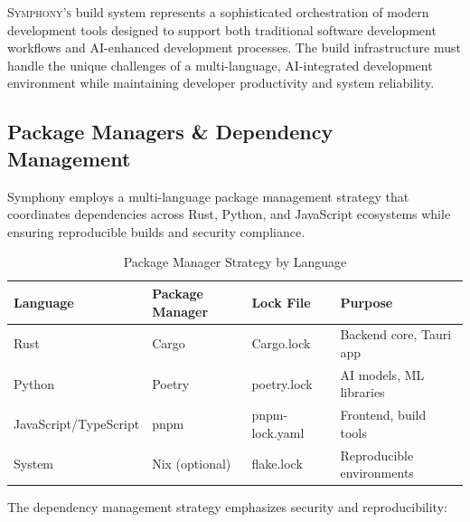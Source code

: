 
\lettrine{S}{ymphony's} build system represents a sophisticated orchestration of modern development tools designed to support both traditional software development workflows and AI-enhanced development processes. The build infrastructure must handle the unique challenges of a multi-language, AI-integrated development environment while maintaining developer productivity and system reliability.

\subsection*{Package Managers \& Dependency Management}

Symphony employs a multi-language package management strategy that coordinates dependencies across Rust, Python, and JavaScript ecosystems while ensuring reproducible builds and security compliance.

\begin{table}[h]
\centering
\caption{Package Manager Strategy by Language}
\begin{tabular}{@{}llll@{}}
\toprule
\textbf{Language} & \textbf{Package Manager} & \textbf{Lock File} & \textbf{Purpose} \\
\midrule
Rust & Cargo & Cargo.lock & Backend core, Tauri app \\
Python & Poetry & poetry.lock & AI models, ML libraries \\
JavaScript/TypeScript & pnpm & pnpm-lock.yaml & Frontend, build tools \\
System & Nix (optional) & flake.lock & Reproducible environments \\
\bottomrule
\end{tabular}
\end{table}

The dependency management strategy emphasizes security and reproducibility:

